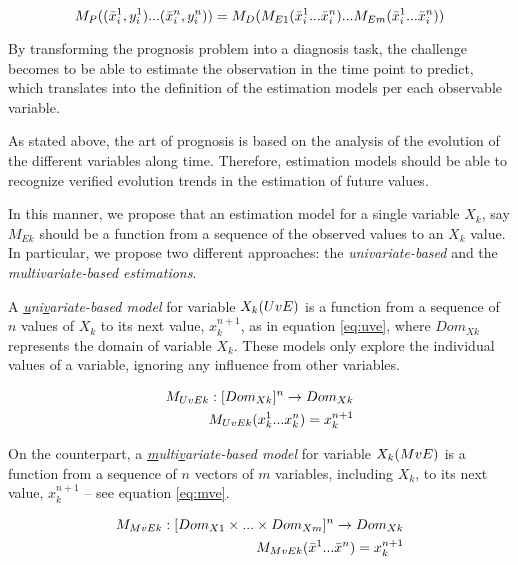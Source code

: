 \begin{equation}
	M_P ((\bar{x}_i^1,y_i^1 )\space...\space(\bar{x}_i^n,y_i^n )) = M_D (M_{E1} (\bar{x}_i^1 \space...\space \bar{x}_i^n ) \space...\space M_{Em}
	(\bar{x}_i^1 \space...\space \bar{x}_i^n ))
\label{eq:prognosis}
\end{equation}

By transforming the prognosis problem into a diagnosis task, the challenge becomes to be able to estimate the observation in the
 time point to predict, which translates into the definition of the estimation models per each observable variable.

As stated above, the art of prognosis is based on the analysis of the evolution of the different variables along time. Therefore,
 estimation models should be able to recognize verified evolution trends in the estimation of future values. 

In this manner, we propose that an estimation model for a single variable $X_k$, say $M_{Ek}$ should be a function from a sequence of the
 observed values to an $X_k$ value. In particular, we propose two different approaches: the \emph{univariate-based} and 
 the \emph{multivariate-based estimations}.

A \emph{\underline{u}ni\underline{v}ariate-based model} for variable $X_k\space(UvE)$ is a function from a sequence of $n$
 values of $X_k$ to its next value, $x_k^{n+1}$, as
 in equation \ref{eq:uve}, where $Dom_{Xk}$ represents the domain of variable $X_k$. These models only explore the individual values of a 
 variable, ignoring any influence from other variables.
 
\begin{eqnarray}
	M_{UvEk}:[Dom_{Xk}]^n \rightarrow Dom_{Xk}        \\ \label{eq:uve}
	M_{UvEk}(x_k^1 \space...\space x_k^n) = x_k^{n+1} \nonumber
\end{eqnarray}

On the counterpart, a \emph{\underline{m}ulti\underline{v}ariate-based model} for variable $X_k \space (MvE)$ is a function from a sequence 
of $n$ vectors of $m$ variables, including $X_k$, to its next value, $x_k^{n+1}$ – see equation \ref{eq:mve}.

\begin{eqnarray}
	M_{MvEk}:[Dom_{X1} \times ... \times Dom_{Xm}]^n \rightarrow Dom_{Xk}  \\ \label{eq:mve}
	M_{MvEk}(\bar{x}^1 \space...\space \bar{x}^n) = x_k^{n+1} \nonumber
\end{eqnarray}


